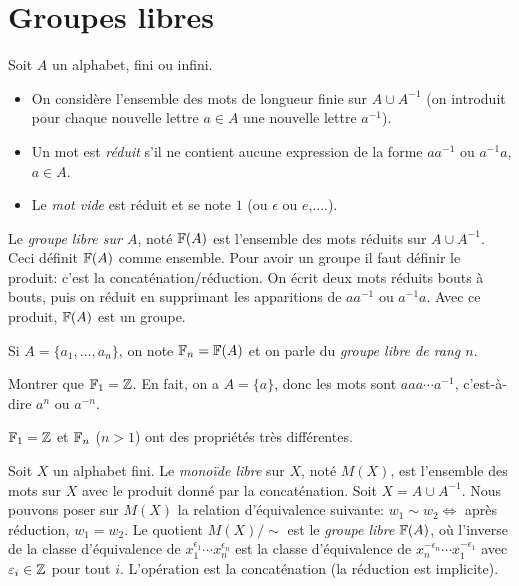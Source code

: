 
\chapter{Groupes libres}

  Soit $A$ un alphabet, fini ou infini.
  \begin{itemize}
  \item On considère l'ensemble des mots de longueur finie sur $A \cup A^{-1}$ (on introduit pour chaque
    nouvelle lettre $a \in A$ une nouvelle lettre $a^{-1}$).
  \item Un mot est \emph{réduit} s'il ne contient aucune expression de la forme $aa^{-1}$ ou $a^{-1}a$, $a \in
    A$.
  \item Le \emph{mot vide} est réduit et se note $1$ (ou $\epsilon$ ou $e$,....).
  \end{itemize}
  
  \begin{defi} \label{defi-1-grp-libre}
    Le \emph{groupe libre sur $A$}, noté $\mathbb{F}(A)$ est l'ensemble des mots réduits sur $A \cup A^{-1}$. Ceci
    définit $\mathbb{F}(A)$ comme ensemble. Pour avoir un groupe il faut définir le produit: c'est la
    concaténation/réduction. On écrit deux mots réduits bouts à bouts, puis on réduit en supprimant les
    apparitions de $aa^{-1}$ ou $a^{-1}a$. Avec ce produit, $\mathbb{F}(A)$ est un groupe.

    Si $A = \{a_1, \ldots, a_n\}$, on note $\mathbb{F}_n = \mathbb{F}(A)$ et on parle du \emph{groupe libre de rang $n$}.
  \end{defi}

  \begin{exercice}
    Montrer que $\mathbb{F}_1 = \mathbb{Z}$. En fait, on a $A = \{a\}$, donc les mots sont $aaa\cdots a^{-1}$, c'est-à-dire
    $a^n$ ou $a^{-n}$.
  \end{exercice}

  \begin{rem}
    $\mathbb{F}_1 = \mathbb{Z}$ et $\mathbb{F}_n$ ($n > 1$) ont des propriétés très différentes.
  \end{rem}

  \begin{defi} \label{defi-2-grp-libre}
    Soit $X$ un alphabet fini. Le \emph{monoïde libre} sur $X$, noté $M(X)$, est l'ensemble des mots sur $X$
    avec le produit donné par la concaténation. Soit $X = A \cup A^{-1}$. Nous pouvons poser sur $M(X)$ la
    relation d'équivalence suivante: $w_1 \sim w_2 \iff $ après réduction, $w_1 = w_2$. Le quotient
    $M(X)/\sim$ est le \emph{groupe libre} $\mathbb{F}(A)$, où l'inverse de la classe d'équivalence de $x_1^{\epsilon_1}
    \cdots x_n^{\epsilon_n}$ est la classe d'équivalence de $x_n^{-\epsilon_n} \cdots x_1^{-\epsilon_1}$ avec
    $\varepsilon_i \in \mathbb{Z}$ pour tout $i$. L'opération est la concaténation (la réduction est implicite).
  \end{defi}

